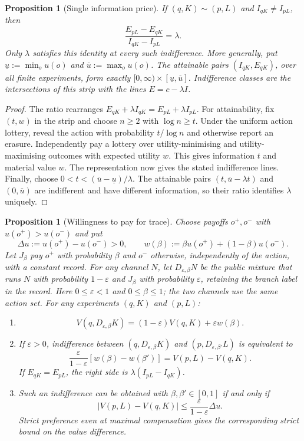 \documentclass[11pt,a4paper]{article}
\newtheorem{proposition}[theorem]{Proposition}
\theoremstyle{definition}
\newcommand{\I}{I}
\newcommand{\1}{\mathbf 1}
\begin{document}
\begin{proposition}[Single information price]
\label{prop:single-price}\label{lem:info-payoff-plane}
If $(q,K)\sim(p,L)$ and $\I_{qK}\ne\I_{pL}$, then
\[
 \frac{E_{pL}-E_{qK}}{\I_{qK}-\I_{pL}}=\lambda.
\]
Only $\lambda$ satisfies this identity at every such indifference.
More generally, put $\underline u:=\min_o u(o)$ and
$\overline u:=\max_o u(o)$. The attainable pairs
$(\I_{qK},E_{qK})$, over all finite experiments, form exactly
$[0,\infty)\times[\underline u,\overline u]$. Indifference classes are
the intersections of this strip with the lines $E=c-\lambda\I$.
\end{proposition}

\begin{proof}
The ratio rearranges $E_{qK}+\lambda\I_{qK}=E_{pL}+\lambda\I_{pL}$.
For attainability, fix $(t,w)$ in the strip and choose $n\ge2$ with
$\log n\ge t$. Under the uniform action lottery, reveal the action with
probability $t/\log n$ and otherwise report an erasure. Independently pay
a lottery over utility-minimising and utility-maximising outcomes with
expected utility $w$. This gives information $t$ and material value $w$.
The representation now gives the stated indifference lines.
Finally, choose $0<t<(\overline u-\underline u)/\lambda$.
The attainable pairs $(t,\overline u-\lambda t)$ and $(0,\overline u)$
are indifferent and have different information, so their ratio identifies
$\lambda$ uniquely.
\end{proof}

\begin{samepage}
\begin{proposition}[Willingness to pay for trace]
\label{prop:wtp}\label{def:dilution}
Choose payoffs $o^+,o^-$ with $u(o^+)>u(o^-)$ and put
\[
 \Delta u:=u(o^+)-u(o^-)>0,\qquad
 w(\beta):=\beta u(o^+)+(1-\beta)u(o^-).
\]
Let $J_\beta$ pay $o^+$ with probability $\beta$ and $o^-$ otherwise,
independently of the action, with a constant record. For any channel $N$,
let $D_{\varepsilon,\beta}N$ be the public mixture that runs $N$ with
probability $1-\varepsilon$ and $J_\beta$ with probability $\varepsilon$,
retaining the branch label in the record. Here $0\le\varepsilon<1$ and
$0\le\beta\le1$; the two channels use the same action set.
For any experiments $(q,K)$ and $(p,L)$:
\begin{enumerate}[label=\textup{(\roman*)},leftmargin=*]
\item
\[
 V(q,D_{\varepsilon,\beta}K)
 =(1-\varepsilon)V(q,K)+\varepsilon w(\beta).
\]
\item If $\varepsilon>0$, indifference between
$(q,D_{\varepsilon,\beta}K)$ and $(p,D_{\varepsilon,\beta'}L)$ is equivalent to
\[
 \frac{\varepsilon}{1-\varepsilon}
 [w(\beta)-w(\beta')]=V(p,L)-V(q,K).
\]
If $E_{qK}=E_{pL}$, the right side is
$\lambda(\I_{pL}-\I_{qK})$.
\item Such an indifference can be obtained with $\beta,\beta'\in[0,1]$
if and only if
\[
 |V(p,L)-V(q,K)|\le
 \frac{\varepsilon}{1-\varepsilon}\Delta u.
\]
Strict preference even at maximal compensation gives the corresponding
strict bound on the value difference.
\end{enumerate}
\end{proposition}
\end{samepage}
\end{document}
